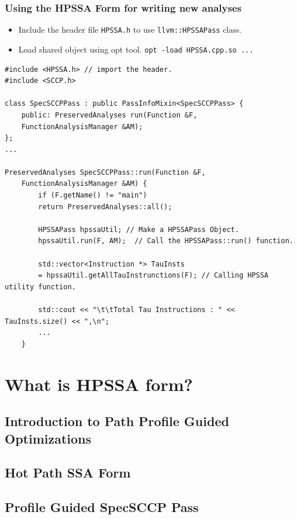 \documentclass[aspectratio=169, compress]{beamer}
\begin{document}
\begin{frame}[fragile]
	\frametitle{Using the HPSSA Form for writing new analyses}
	\begin{itemize}
		\item Include the header file \texttt{HPSSA.h} to use  \texttt{llvm::HPSSAPass} class.
		\item Load shared object using opt tool. \texttt{opt -load HPSSA.cpp.so ...} 
	\end{itemize}
	\begin{verbatim}
#include <HPSSA.h> // import the header.
#include <SCCP.h>

class SpecSCCPPass : public PassInfoMixin<SpecSCCPPass> {
	public: PreservedAnalyses run(Function &F, 
	FunctionAnalysisManager &AM);
};
...

PreservedAnalyses SpecSCCPPass::run(Function &F, 
	FunctionAnalysisManager &AM) {
		if (F.getName() != "main")
		return PreservedAnalyses::all();
		
		HPSSAPass hpssaUtil; // Make a HPSSAPass Object.
		hpssaUtil.run(F, AM);  // Call the HPSSAPass::run() function.
		
		std::vector<Instruction *> TauInsts 
		= hpssaUtil.getAllTauInstrunctions(F); // Calling HPSSA utility function.
		
		std::cout << "\t\tTotal Tau Instructions : " << TauInsts.size() << ",\n";
		...
	}
	\end{verbatim}
\end{frame}
\section{What is HPSSA form?}
\subsection{Introduction to Path Profile Guided Optimizations}
{
	
}
\subsection{Hot Path SSA Form}
{
	
}
\subsection{Profile Guided SpecSCCP Pass}
{
	
}
\end{document}
